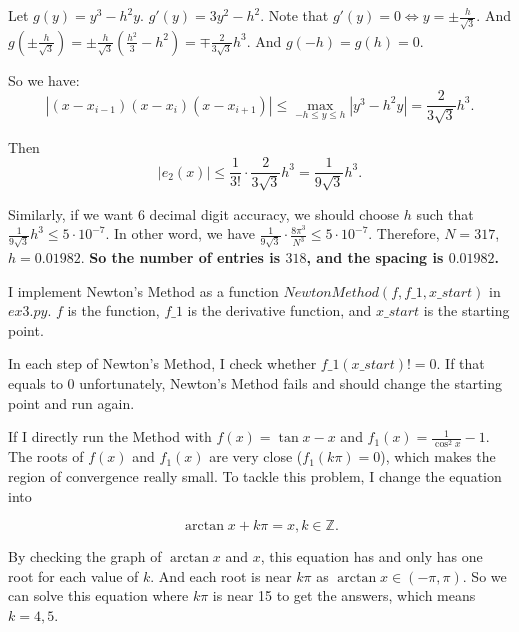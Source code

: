 \documentclass[
  course = {{16-811 Math Fundamentals for Robotics}},
  quartile = {{1}},
  assignment = 2,
  name = {{Kangle Deng}},
  email = {{kangled@andrew.cmu.edu}},
  firstexercise = 1
]{aga-homework}
\begin{document}
Let $g(y) = y^3 - h^2y$. $g'(y) = 3y^2 - h^2$. Note that $g'(y) = 0 \Leftrightarrow y = \pm \frac{h}{\sqrt{3}}$. And $g(\pm \frac{h}{\sqrt{3}}) = \pm \frac{h}{\sqrt{3}}(\frac{h^2}{3} - h^2) = \mp \frac{2}{3\sqrt{3}} h^3$. And $g(-h) = g(h) = 0$.

So we have:
\begin{equation*}
    | (x-x_{i-1})(x-x_i)(x-x_{i+1}) | \le \max \limits_{-h \le y \le h} | y^3 - h^2y | = \frac{2}{3\sqrt{3}} h^3.
\end{equation*}

Then
\begin{equation*}
    |e_2(x)| \le \frac{1}{3!} \cdot \frac{2}{3\sqrt{3}} h^3 = \frac{1}{9\sqrt{3}}h^3.
\end{equation*}

Similarly, if we want 6 decimal digit accuracy, we should choose $h$ such that $\frac{1}{9\sqrt{3}}h^3 \le 5 \cdot 10^{-7}$. In other word, we have $\frac{1}{9\sqrt{3}} \cdot \frac{8\pi^3}{N^3} \le 5 \cdot 10^{-7}$. Therefore, $N = 317$, $h = 0.01982$. \textbf{So the number of entries is $318$, and the spacing is $0.01982$.}

\exercise
I implement Newton's Method as a function $NewtonMethod(f, f\_1, x\_start)$ in $ex3.py$. $f$ is the function, $f\_1$ is the derivative function, and $x\_start$ is the starting point.


In each step of Newton's Method, I check whether $f\_1(x\_start) != 0$. If that equals to $0$ unfortunately, Newton's Method fails and should change the starting point and run again.

If I directly run the Method with $f(x)=\tan x - x$ and $f_1(x) = \frac{1}{\cos^2x} - 1$. The roots of $f(x)$ and $f_1(x)$ are very close ($f_1(k\pi) = 0$), which makes the region of convergence really small. To tackle this problem, I change the equation into

\begin{equation*}
    \arctan x + k\pi = x, k \in \mathbb{Z}.
\end{equation*}

By checking the graph of $\arctan x$ and $x$, this equation has and only has one root for each value of $k$. And each root is near $k\pi$ as $\arctan x \in (-\pi, \pi)$. So we can solve this equation where $k\pi$ is near 15 to get the answers, which means $k = 4, 5$.
\end{document}
